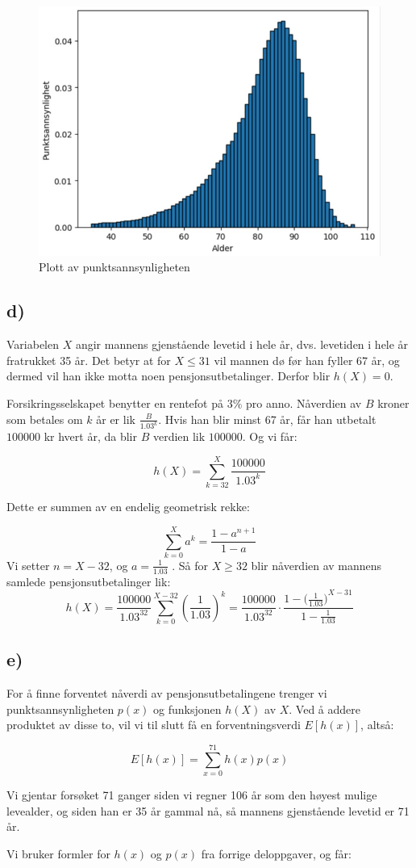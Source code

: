 \documentclass[a4paper, 12pt]{article}
\begin{document}
\begin{figure}[h]
    \centering
    \includegraphics[width=0.5\linewidth]{figur1.jpg}
    \caption{Plott av punktsannsynligheten}
    \label{fig:enter-label}
\end{figure}

\subsection*{d)}
\begin{FlushLeft}
Variabelen \(X\) angir mannens gjenstående levetid i hele år, dvs. levetiden i hele år fratrukket 35 år. Det betyr at for \(X \leq 31\) vil mannen dø før han fyller 67 år, og
dermed vil han ikke motta noen pensjonsutbetalinger. Derfor blir \(h(X)=0\).
\end{FlushLeft}
\begin{FlushLeft}
Forsikringsselskapet benytter en rentefot på \(3\%\) pro anno. Nåverdien av \(B\) kroner som betales om \(k\) år er lik \(\frac{B}{{1.03}^{k}}\). Hvis han blir minst 67 år, får han utbetalt \(100000\) kr hvert år, da blir \(B\) verdien lik \(100000\). Og vi får:
\end{FlushLeft}
\[
h(X) = \sum_{k=32}^{X} \frac{100000}{{1.03}^{k}}
\]
\begin{FlushLeft}
Dette er summen av en endelig geometrisk rekke:
\end{FlushLeft}
\[
\sum_{k=0}^{X} a^{k} = \frac{1-{a}^{n+1}}{1-a}
\]
Vi setter \(n=X-32\), og \(a= \frac{1}{1.03}\)
. Så for \(X \geq 32\) blir nåverdien av mannens samlede
pensjonsutbetalinger lik:
\[
h(X) = \frac{100000}{{1.03}^{32}} \sum_{k=0}^{X-32} (\frac{1}{1.03})^{k} = \frac{100000}{{1.03}^{32}} \cdot \frac{1-({\frac{1}{1.03})}^{X-31}}{1-{\frac{1}{1.03}}}
\]

\subsection*{e)}
\begin{FlushLeft}
For å finne forventet nåverdi av pensjonsutbetalingene trenger vi punktsannsynligheten \( p(x) \) og funksjonen \( h(X) \) av \( X \). Ved å addere produktet av disse to, vil vi til slutt få en forventningsverdi \( E[h(x)] \), altså:
\end{FlushLeft}
\[
E[h(x)] = \sum_{x=0}^{71} h(x)p(x)
\]
\begin{FlushLeft}
Vi gjentar forsøket 71 ganger siden vi regner 106 år som den høyest mulige levealder, og siden han er 35 år gammal nå, så mannens gjenstående levetid er 71 år.
\end{FlushLeft}
\begin{FlushLeft}
Vi bruker formler for \( h(x) \) og \( p(x) \) fra forrige deloppgaver, og får:
\end{FlushLeft}
\end{document}

